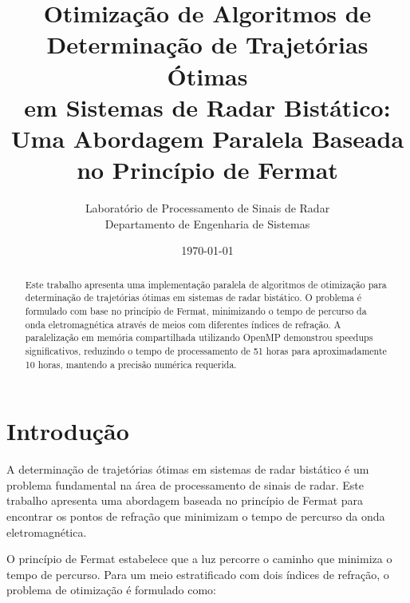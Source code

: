 \documentclass[12pt,a4paper]{article}
\begin{document}
\title{\textbf{Otimização de Algoritmos de Determinação de Trajetórias Ótimas \\ em Sistemas de Radar Bistático: \\ Uma Abordagem Paralela Baseada no Princípio de Fermat}}
\author{Laboratório de Processamento de Sinais de Radar\\Departamento de Engenharia de Sistemas}
\date{\today}
\maketitle

\tableofcontents
\newpage

\begin{abstract}
Este trabalho apresenta uma implementação paralela de algoritmos de otimização para determinação de trajetórias ótimas em sistemas de radar bistático. O problema é formulado com base no princípio de Fermat, minimizando o tempo de percurso da onda eletromagnética através de meios com diferentes índices de refração. A paralelização em memória compartilhada utilizando OpenMP demonstrou speedups significativos, reduzindo o tempo de processamento de 51 horas para aproximadamente 10 horas, mantendo a precisão numérica requerida.
\end{abstract}

\section{Introdução}

A determinação de trajetórias ótimas em sistemas de radar bistático é um problema fundamental na área de processamento de sinais de radar. Este trabalho apresenta uma abordagem baseada no princípio de Fermat para encontrar os pontos de refração que minimizam o tempo de percurso da onda eletromagnética.

O princípio de Fermat estabelece que a luz percorre o caminho que minimiza o tempo de percurso. Para um meio estratificado com dois índices de refração, o problema de otimização é formulado como:
\end{document}
